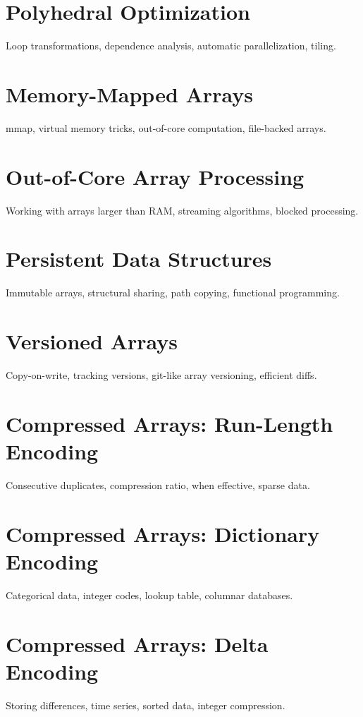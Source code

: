 \chapter{Polyhedral Optimization}
Loop transformations, dependence analysis, automatic parallelization, tiling.


\chapter{Memory-Mapped Arrays}
mmap, virtual memory tricks, out-of-core computation, file-backed arrays.

\chapter{Out-of-Core Array Processing}
Working with arrays larger than RAM, streaming algorithms, blocked processing.

\chapter{Persistent Data Structures}
Immutable arrays, structural sharing, path copying, functional programming.

\chapter{Versioned Arrays}
Copy-on-write, tracking versions, git-like array versioning, efficient diffs.

\chapter{Compressed Arrays: Run-Length Encoding}
Consecutive duplicates, compression ratio, when effective, sparse data.

\chapter{Compressed Arrays: Dictionary Encoding}
Categorical data, integer codes, lookup table, columnar databases.

\chapter{Compressed Arrays: Delta Encoding}
Storing differences, time series, sorted data, integer compression.

